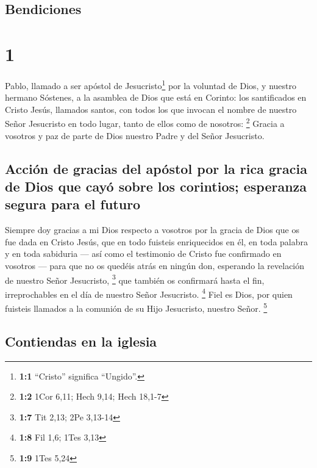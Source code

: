 \hypertarget{bendiciones}{%
\subsection{Bendiciones}\label{bendiciones}}

\hypertarget{section}{%
\section{1}\label{section}}

 Pablo, llamado a ser apóstol de Jesucristo\footnote{\textbf{1:1}
  ``Cristo'' significa ``Ungido''.} por la voluntad de Dios, y nuestro
hermano Sóstenes,  a la asamblea de Dios que está en
Corinto: los santificados en Cristo Jesús, llamados santos, con todos
los que invocan el nombre de nuestro Señor Jesucristo en todo lugar,
tanto de ellos como de nosotros: \footnote{\textbf{1:2} 1Cor 6,11; Hech
  9,14; Hech 18,1-7}  Gracia a vosotros y paz de parte de
Dios nuestro Padre y del Señor Jesucristo.

\hypertarget{acciuxf3n-de-gracias-del-apuxf3stol-por-la-rica-gracia-de-dios-que-cayuxf3-sobre-los-corintios-esperanza-segura-para-el-futuro}{%
\subsection{Acción de gracias del apóstol por la rica gracia de Dios que
cayó sobre los corintios; esperanza segura para el
futuro}\label{acciuxf3n-de-gracias-del-apuxf3stol-por-la-rica-gracia-de-dios-que-cayuxf3-sobre-los-corintios-esperanza-segura-para-el-futuro}}

 Siempre doy gracias a mi Dios respecto a vosotros por la
gracia de Dios que os fue dada en Cristo Jesús,  que en
todo fuisteis enriquecidos en él, en toda palabra y en toda sabiduria
---  así como el testimonio de Cristo fue confirmado en
vosotros ---  para que no os quedéis atrás en ningún don,
esperando la revelación de nuestro Señor Jesucristo, \footnote{\textbf{1:7}
  Tit 2,13; 2Pe 3,13-14}  que también os confirmará hasta
el fin, irreprochables en el día de nuestro Señor Jesucristo.
\footnote{\textbf{1:8} Fil 1,6; 1Tes 3,13}  Fiel es Dios,
por quien fuisteis llamados a la comunión de su Hijo Jesucristo, nuestro
Señor. \footnote{\textbf{1:9} 1Tes 5,24}

\hypertarget{contiendas-en-la-iglesia}{%
\subsection{Contiendas en la iglesia}\label{contiendas-en-la-iglesia}}

